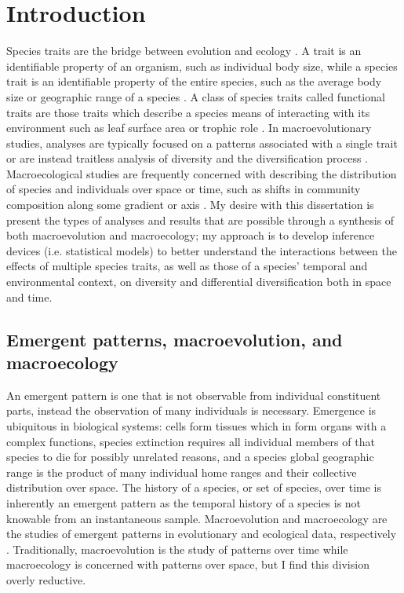 \chapter{Introduction} \label{ch:intro}

Species traits are the bridge between evolution and ecology \citep{Mcgill2006,Weber2017}. A trait is an identifiable property of an organism, such as individual body size, while a species trait is an identifiable property of the entire species, such as the average body size or geographic range of a species \citep{Mcgill2006}. A class of species traits called functional traits are those traits which describe a species means of interacting with its environment such as leaf surface area or trophic role \citep{Mcgill2006}. In macroevolutionary studies, analyses are typically focused on a patterns associated with a single trait or are instead traitless analysis of diversity and the diversification process \citep{Silvestro2014a,Silvestro2015b,Pires2015a,Rabosky2013,Slater2015c,Hunt2007a,Hunt2006a,Liow2008,Payne2007}. Macroecological studies are frequently concerned with describing the distribution of species and individuals over space or time, such as shifts in community composition along some gradient or axis \citep{Smith2008b,Smith2004,Brown1995,Brown1989,Bush2007,Eronen2009,Fortelius2002,Jernvall2002,Jernvall2004}. My desire with this dissertation is present the types of analyses and results that are possible through a synthesis of both macroevolution and macroecology; my approach is to develop inference devices (i.e. statistical models) to better understand the interactions between the effects of multiple species traits, as well as those of a species' temporal and environmental context, on diversity and differential diversification both in space and time.


\section{Emergent patterns, macroevolution, and macroecology}

An emergent pattern is one that is not observable from individual constituent parts, instead the observation of many individuals is necessary. Emergence is ubiquitous in biological systems: cells form tissues which in form organs with a complex functions, species extinction requires all individual members of that species to die for possibly unrelated reasons, and a species global geographic range is the product of many individual home ranges and their collective distribution over space. The history of a species, or set of species, over time is inherently an emergent pattern as the temporal history of a species is not knowable from an instantaneous sample. Macroevolution and macroecology are the studies of emergent patterns in evolutionary and ecological data, respectively \citep{Brown1989,Brown1995,Stanley1979,Stanley1975}. Traditionally, macroevolution is the study of patterns over time while macroecology is concerned with patterns over space, but I find this division overly reductive.

